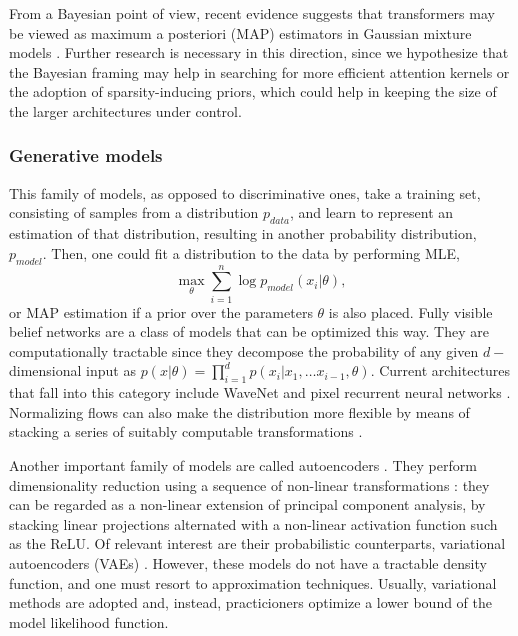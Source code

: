 From a Bayesian point of view, recent evidence suggests that transformers may be viewed as maximum 
a posteriori (MAP) estimators in 
 Gaussian mixture models \citep{movellan2020probabilistic}. Further research is necessary in this direction, since we hypothesize that the Bayesian framing may help in searching for more efficient attention kernels or the adoption of sparsity-inducing priors, which could help in keeping the size of the larger architectures under control.


\subsubsection{Generative models} 
This family of models, as opposed to discriminative ones, take a training set, consisting of samples from a distribution $p_{data}$, and learn to represent an estimation of that distribution, resulting in another probability distribution, $p_{model}$. Then, one could fit a distribution to the data by performing MLE,
$$
\max_{\theta} \sum_{i=1}^n \log p_{model} (x_i | \theta),
$$
or MAP estimation if a prior over the parameters $\theta$ is also placed. Fully visible belief networks \citep{10.5555/2998828.2998922} are a class of models that can be optimized this way. They are computationally tractable since they decompose the probability of any given $d-$dimensional input as $p(x | \theta) = \prod_{i=1}^d p(x_i | x_1 , \ldots x_{i-1}, \theta)$. Current architectures that fall into this category include WaveNet \citep{oord2016wavenet} and pixel recurrent neural networks \citep{pmlr-v48-oord16}. Normalizing flows can also make the distribution more flexible by means of stacking a series of suitably computable transformations \citep{pmlr-v37-rezende15}.

Another important family of models are called autoencoders \citep{autoencoders}. They perform dimensionality reduction 
using a sequence of non-linear transformations \citep{baldi2012autoencoders}: they can be regarded as a non-linear extension of principal component analysis, by stacking linear projections alternated with a non-linear activation function such as the ReLU. 
Of relevant interest are their probabilistic counterparts, variational autoencoders (VAEs) \citep{kingma2013auto}. However, these models do not have a tractable density function, and one must resort to approximation techniques. Usually, variational methods are adopted and, instead, practicioners optimize a lower bound of the model likelihood function.

